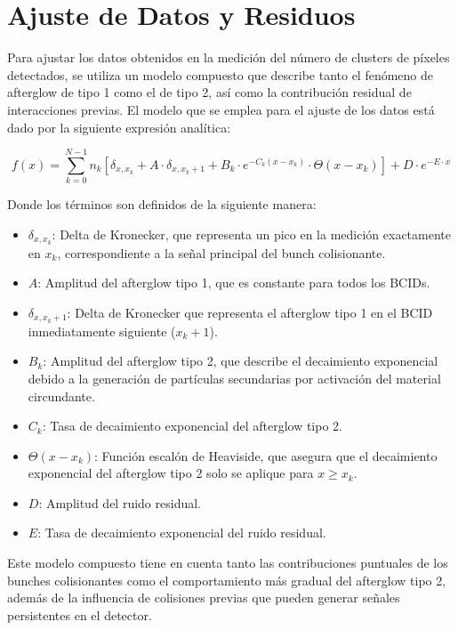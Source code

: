 \section{Ajuste de Datos y Residuos}

Para ajustar los datos obtenidos en la medición del número de clusters de píxeles detectados, se utiliza un modelo compuesto que describe tanto el fenómeno de afterglow de tipo 1 como el de tipo 2, así como la contribución residual de interacciones previas. El modelo que se emplea para el ajuste de los datos está dado por la siguiente expresión analítica:

\[
f(x) = \sum_{k=0}^{N-1} n_k \left[ \delta_{x, x_k} + A \cdot \delta_{x, x_k + 1} + B_k \cdot e^{-C_k(x - x_k)} \cdot \Theta(x - x_k) \right] + D \cdot e^{-E \cdot x}
\]

Donde los términos son definidos de la siguiente manera:

\begin{itemize}
    \item $\delta_{x, x_k}$: Delta de Kronecker, que representa un pico en la medición exactamente en $x_k$, correspondiente a la señal principal del bunch colisionante.
    \item $A$: Amplitud del afterglow tipo 1, que es constante para todos los BCIDs.
    \item $\delta_{x, x_k + 1}$: Delta de Kronecker que representa el afterglow tipo 1 en el BCID inmediatamente siguiente ($x_k + 1$).
    \item $B_k$: Amplitud del afterglow tipo 2, que describe el decaimiento exponencial debido a la generación de partículas secundarias por activación del material circundante.
    \item $C_k$: Tasa de decaimiento exponencial del afterglow tipo 2.
    \item $\Theta(x - x_k)$: Función escalón de Heaviside, que asegura que el decaimiento exponencial del afterglow tipo 2 solo se aplique para $x \geq x_k$.
    \item $D$: Amplitud del ruido residual.
    \item $E$: Tasa de decaimiento exponencial del ruido residual.
\end{itemize}

Este modelo compuesto tiene en cuenta tanto las contribuciones puntuales de los bunches colisionantes como el comportamiento más gradual del afterglow tipo 2, además de la influencia de colisiones previas que pueden generar señales persistentes en el detector.

